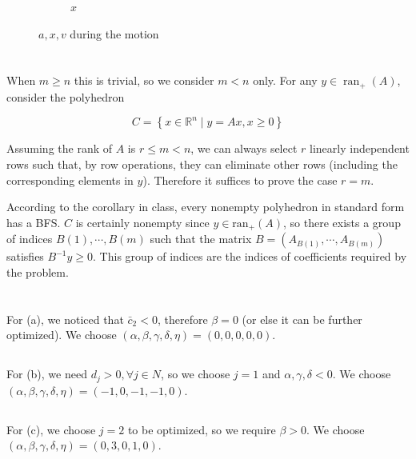 \documentclass{article}
\newcommand{\1}{\bm 1}
\begin{document}
\begin{figure}
\begin{subfigure}[b]{0.3\textwidth}
        \caption{$x$}
    \end{subfigure}
       \caption{$a, x, v$ during the motion}
\end{figure}

\section{}

When $m\ge n$ this is trivial, so we consider $m < n$ only. For any $y\in\operatorname{ran}_+(A)$, consider the polyhedron

$$
C=\left\{x \in \mathbb{R}^{n} \mid y=A x, x \geq 0\right\}
$$

Assuming the rank of $A$ is $r\le m<n$, we can always select $r$ linearly independent rows such that, by row operations, they can eliminate other rows (including the corresponding elements in $y$). Therefore it suffices to prove the case $r=m$.

According to the corollary in class, every nonempty polyhedron in standard form has a BFS. $C$ is certainly nonempty since $y\in\textrm{ran}_+(A)$, so there exists a group of indices $B(1), \cdots, B(m)$ such that the matrix $B=(A_{B(1)}, \cdots, A_{B(m)})$ satisfies $B^{-1}y\ge 0$. This group of indices are the indices of coefficients required by the problem.

\section{}

\subsection{}

For (a), we noticed that $\bar c_2<0$, therefore $\beta=0$ (or else it can be further optimized). We choose $(\alpha,\beta,\gamma,\delta,\eta)=(0, 0, 0, 0, 0)$.

\subsection{}

For (b), we need $d_j>0,\forall j\in N$, so we choose $j=1$ and $\alpha,\gamma,\delta <0$. We choose $(\alpha,\beta,\gamma,\delta,\eta)=(-1, 0, -1, -1, 0)$.

\subsection{}

For (c), we choose $j=2$ to be optimized, so we require $\beta>0$. We choose $(\alpha,\beta,\gamma,\delta,\eta)=(0, 3, 0, 1, 0)$.
\end{document}
